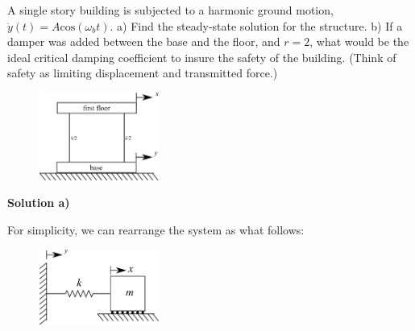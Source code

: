 \documentclass[12pt,a4paper]{article}
\begin{document}
			A single story building is subjected to a harmonic ground motion, $\ddot{y}(t) = A \text{cos}(\omega_b t)$. a) Find the steady-state solution for the structure.  b) If a damper was added between the base and the floor, and $r=2$, what would be the ideal critical damping coefficient to insure the safety of the building. (Think of safety as limiting displacement and transmitted force.) 
			\begin{figure}[H]
				\centering
				\includegraphics[width=0.35\textwidth]{../../Figures/base_excited_structure.png}
			\end{figure}				
						
			\textbf{Solution a)}
				
			For simplicity, we can rearrange the system as what follows:
			\begin{figure}[H]
				\centering
				\includegraphics[width=0.35\textwidth]{../../Figures/base_excited_structure_simple.png}
			\end{figure}			
\end{document}

